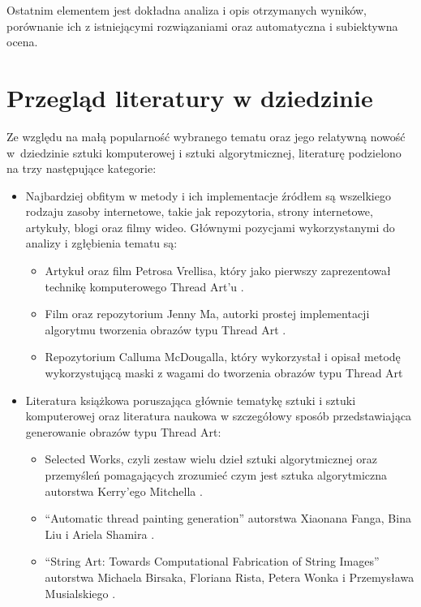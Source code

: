    Ostatnim elementem jest dokładna analiza i opis otrzymanych wyników, porównanie ich z istniejącymi rozwiązaniami oraz automatyczna i subiektywna ocena. 

    \section{Przegląd literatury w dziedzinie} \label{intro-literature}
    Ze względu na małą popularność wybranego tematu oraz jego relatywną nowość w~dziedzinie sztuki komputerowej i sztuki algorytmicznej, literaturę podzielono na trzy następujące kategorie:
    \begin{itemize}
        \item Najbardziej obfitym w metody i ich implementacje źródłem są wszelkiego rodzaju zasoby internetowe, takie jak repozytoria, strony internetowe, artykuły, blogi oraz filmy wideo. Głównymi pozycjami wykorzystanymi do analizy i zgłębienia tematu są:
        \begin{itemize}
            \item Artykuł oraz film Petrosa Vrellisa, który jako pierwszy zaprezentował technikę komputerowego Thread Art'u \cite{new-way-to-knit}.
            \item Film oraz repozytorium Jenny Ma, autorki prostej implementacji algorytmu tworzenia obrazów typu Thread Art \cite{jenny-github} \cite{jenny-youtube}.
            \item Repozytorium Calluma McDougalla, który wykorzystał i opisał metodę wykorzystującą maski z wagami do tworzenia obrazów typu Thread Art \cite{callum-github}
        \end{itemize}
        \item Literatura książkowa poruszająca głównie tematykę sztuki i sztuki komputerowej oraz literatura naukowa w szczegółowy sposób przedstawiająca generowanie obrazów typu Thread Art:
        \begin{itemize}
            \item Selected Works, czyli zestaw wielu dzieł sztuki algorytmicznej oraz przemyśleń pomagających zrozumieć czym jest sztuka algorytmiczna autorstwa Kerry'ego Mitchella \cite{selected-works}.
            \item ``Automatic thread painting generation'' autorstwa Xiaonana Fanga, Bina Liu i Ariela Shamira \cite{article-string-art-xiaonan}.
            \item ``String Art: Towards Computational Fabrication of String Images'' autorstwa Michaela Birsaka, Floriana Rista, Petera Wonka i Przemysława Musialskiego \cite{article-string-art-birsak}.

\end{itemize}
\end{itemize}
